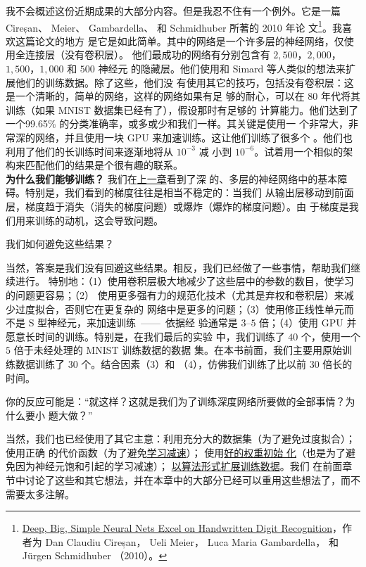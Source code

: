 我不会概述这份近期成果的大部分内容。但是我忍不住有一个例外。它是一篇 Cireșan、
Meier、 Gambardella、 和 Schmidhuber 所著的 2010 年论
文\footnote{\href{http://arxiv.org/abs/1003.0358}{Deep, Big, Simple Neural Nets
    Excel on Handwritten Digit Recognition}，作者为 Dan Claudiu Cireșan， Ueli Meier，
  Luca Maria Gambardella， 和 Jürgen Schmidhuber （2010）。}。我喜欢这篇论文的地方
是它是如此简单。其中的网络是一个许多层的神经网络，仅使用全连接层（没有卷积层）。
他们最成功的网络有分别包含有 $2,500$，$2,000$，$1,500$，$1,000$ 和 $500$ 神经元
的隐藏层。他们使用和 Simard 等人类似的想法来扩展他们的训练数据。除了这些，他们没
有使用其它的技巧，包括没有卷积层：这是一个清晰的，简单的网络，这样的网络如果有足
够的耐心，可以在 80 年代将其训练（如果 MNIST 数据集已经有了），假设那时有足够的
计算能力。他们达到了一个99.65\% 的分类准确率，或多或少和我们一样。其关键是使用一
个非常大，非常深的网络，并且使用一块 GPU 来加速训练。这让他们训练了很多个%
\epochs{}。他们也利用了他们的长训练时间来逐渐地将\learningrate{}从 $10^{-3}$ 减
小到 $10^{-6}$。试着用一个相似的架构来匹配他们的结果是个很有趣的联系。\\

\textbf{为什么我们能够训练？} 我们在\hyperref[ch:WhyHardToTrain]{上一章}看到了深
的、多层的神经网络中的基本障碍。特别是，我们看到的梯度往往是相当不稳定的：当我们
从输出层移动到前面层，梯度趋于消失（消失的梯度问题）或爆炸（爆炸的梯度问题）。由
于梯度是我们用来训练的动机，这会导致问题。

我们如何避免这些结果？

当然，答案是我们没有回避这些结果。相反，我们已经做了一些事情，帮助我们继续进行。
特别地：（1）使用卷积层极大地减少了这些层中的参数的数目，使学习的问题更容易；（2）
使用更多强有力的规范化技术（尤其是弃权和卷积层）来减少过度拟合，否则它在更复杂的
网络中是更多的问题；（3）使用修正线性单元而不是 S 型神经元，来加速训练~——~依据经
验通常是 $3$--$5$ 倍；（4）使用 GPU 并愿意长时间的训练。特别是，在我们最后的实验
中，我们训练了 $40$ 个\epochs{}，使用一个 $5$ 倍于未经处理的 MNIST 训练数据的数据
集。在本书前面，我们主要用原始训练数据训练了 $30$ 个\epochs{}。结合因素（3）和
（4），仿佛我们训练了比以前 $30$ 倍长的时间。

你的反应可能是：“就这样？这就是我们为了训练深度网络所要做的全部事情？为什么要小
题大做？”

当然，我们也已经使用了其它主意：利用充分大的数据集（为了避免过度拟合）；使用正确
的代价函数（为了避免\hyperref[sec:the_cross-entropy_cost_function]{学习减速}）；
使用\hyperref[how_to_choose_a_neural_network's_hyper-parameters]{好的权重初始
  化}（也是为了避免因为神经元饱和引起的学习减速）；%
\hyperref[sec:other_techniques_for_regularization]{以算法形式扩展训练数据}。我们
在前面章节中讨论了这些和其它想法，并在本章中的大部分已经可以重用这些想法了，而不
需要太多注解。

